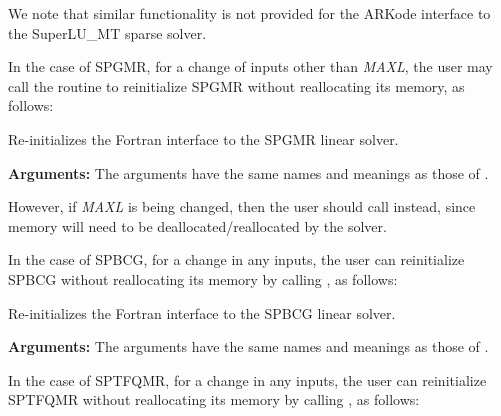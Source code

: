 \documentclass[letterpaper,10pt,english]{sphinxmanual}
\begin{document}
We note that similar functionality is not provided for the ARKode
interface to the SuperLU\_MT sparse solver.

In the case of SPGMR, for a change of inputs other than \emph{MAXL},
the user may call the routine {\hyperref[f_interface/Usage:f/_/FARKSPGMRREINIT]{\emph{}}} to
reinitialize SPGMR without reallocating its memory, as follows:

\begin{fulllineitems}
\label{f_interface/Usage:f/_/FARKSPGMRREINIT}
Re-initializes the Fortran interface to the SPGMR linear solver.

\textbf{Arguments:}  The arguments have the same names and meanings as those of
{\hyperref[f_interface/Usage:f/_/FARKSPGMR]{\emph{}}}.

\end{fulllineitems}


However, if \emph{MAXL} is being changed, then the user should call
{\hyperref[f_interface/Usage:f/_/FARKSPGMR]{\emph{}}} instead, since memory will need to be
deallocated/reallocated by the solver.

In the case of SPBCG, for a change in any inputs, the user can
reinitialize SPBCG without reallocating its memory by calling
{\hyperref[f_interface/Usage:f/_/FARKSPBCGREINIT]{\emph{}}}, as follows:

\begin{fulllineitems}
\label{f_interface/Usage:f/_/FARKSPBCGREINIT}
Re-initializes the Fortran interface to the SPBCG
linear solver.

\textbf{Arguments:}  The arguments have the same names and meanings as
those of {\hyperref[f_interface/Usage:f/_/FARKSPBCG]{\emph{}}}.

\end{fulllineitems}


In the case of SPTFQMR, for a change in any inputs, the user can
reinitialize SPTFQMR without reallocating its memory by calling
{\hyperref[f_interface/Usage:f/_/FARKSPTFQMRREINIT]{\emph{}}}, as follows:
\end{document}
